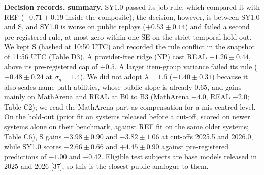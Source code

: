 \documentclass[
]{article}
\begin{document}
\textbf{Decision records, summary.} SY1.0 passed its job rule, which
compared it with REF (\(-0.71 \pm 0.19\) inside the composite); the
decision, however, is between SY1.0 and S, and SY1.0 is worse on public
replays (\(+0.53 \pm 0.14\)) and failed a second pre-registered rule, at
most zero within one SE on the strict temporal hold-out. We kept S
(hashed at 10:50 UTC) and recorded the rule conflict in the snapshot of
11:56 UTC (Table D3). A provider-free ridge (NP) cost REAL
\(+1.26 \pm 0.44\), above its pre-registered cap of \(+0.5\). A larger
item-group variance failed its rule (\(+0.48 \pm
0.24\) at \(\sigma_g = 1.4\)). We did not adopt \(\lambda = 1.6\)
(\(-1.40 \pm 0.31\)) because it also scales name-path abilities, whose
public slope is already 0.65, and gains mainly on MathArena and REAL at
B0 to B3 (MathArena \(-4.0\), REAL \(-2.0\); Table C2); we read the
MathArena part as compensation for a mis-centred level. On the hold-out
(prior fit on systems released before a cut-off, scored on newer systems
alone on their benchmark, against REF fit on the same older systems;
Table C6), S gains \(-3.98 \pm 0.90\) and \(-3.82 \pm 1.06\) at cut-offs
2025.5 and 2026.0, while SY1.0 scores \(+2.66 \pm 0.66\) and
\(+4.45 \pm 0.90\) against pre-registered predictions of \(-1.00\) and
\(-0.42\). Eligible test subjects are base models released in 2025 and
2026 {[}37{]}, so this is the closest public analogue to them.
\end{document}

